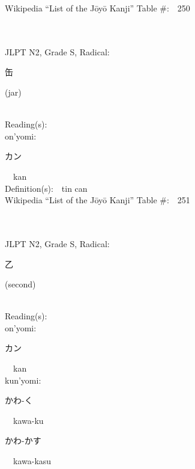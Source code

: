 \begin{multicols}{2}
Wikipedia ``List of the J\=oy\=o Kanji'' Table \#:\ \ 250 \\
\ \ \\
{\fontsize{34pt}{40pt}  }\ \ \\  %
{JLPT N2, Grade S, Radical:\ \ {\begin{CJK}{UTF8}{min} 缶 \end{CJK}} (jar) } \\
Reading(s):\ \ \\
{\hspace*{1em}}on'yomi:\ \ \\
{\hspace*{2em}}{\begin{CJK}{UTF8}{min} カン \end{CJK}}\ \ kan\ \ \\
Definition(s):\ \ tin can \\
Wikipedia ``List of the J\=oy\=o Kanji'' Table \#:\ \ 251 \\
\ \ \\
{\fontsize{34pt}{40pt}  }\ \ \\  %
{JLPT N2, Grade S, Radical:\ \ {\begin{CJK}{UTF8}{min} 乙 \end{CJK}} (second) } \\
Reading(s):\ \ \\
{\hspace*{1em}}on'yomi:\ \ \\
{\hspace*{2em}}{\begin{CJK}{UTF8}{min} カン \end{CJK}}\ \ kan\ \ \\
{\hspace*{1em}}kun'yomi:\ \ \\
{\hspace*{2em}}{\begin{CJK}{UTF8}{min} かわ-く \end{CJK}}\ \ kawa-ku\ \ \\
{\hspace*{2em}}{\begin{CJK}{UTF8}{min} かわ-かす \end{CJK}}\ \ kawa-kasu\ \ \\

\end{multicols}
